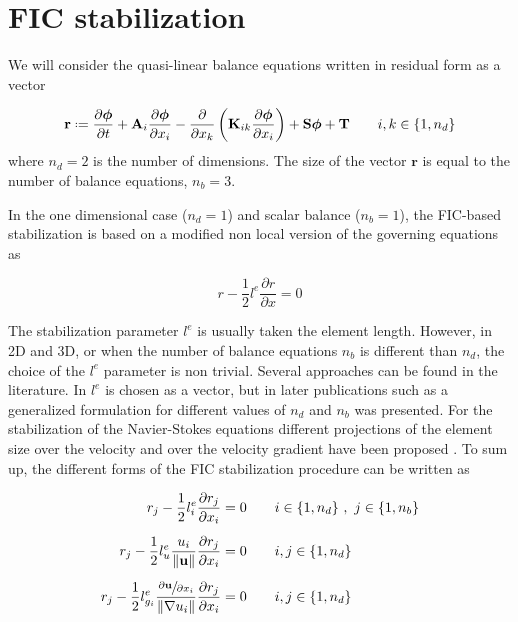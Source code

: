 \documentclass[a4paper,12pt]{article}
\newcommand{\pder}[2]{\frac{\partial#1}{\partial#2}}
\newcommand{\norm}[1]{\lVert#1\rVert}
\newcommand{\defeq}{\mathrel{\vcenter{\baselineskip0.5ex\lineskiplimit0pt\hbox{\scriptsize.}\hbox{\scriptsize.}}}=}
\begin{document}
\section{FIC stabilization}\label{sec:stabilization}

We will consider the quasi-linear balance equations written in residual form as a vector

\begin{equation} \label{residual}
\mathbf{r} \defeq 
  \pder{\bm{\phi}}{t} + \mathbf{A}_i\pder{\bm{\phi}}{x_i}
  -\pder{}{x_k}\left(\mathbf{K}_{ik}\pder{\bm{\phi}}{x_i}\right) + \mathbf{S}\bm{\phi} + \mathbf{T} \qquad i,k\in\{1,n_d\}
\end{equation}
where $n_d=2$ is the number of dimensions. The size of the vector $\mathbf{r}$ is equal to the number of balance equations, $n_b=3$.

In the one dimensional case ($n_d=1$) and scalar balance ($n_b=1$), the FIC-based stabilization is based on a modified non local version of the governing equations as \cite{onate1998}

\begin{equation}
r - \frac{1}{2}l^e\pder{r}{x} = 0
\end{equation}

The stabilization parameter $l^e$ is usually taken the element length. However, in 2D and 3D, or when the number of balance equations $n_b$ is different than $n_d$, the choice of the $l^e$ parameter is non trivial.
Several approaches can be found in the literature. In \cite{onate1998} $l^e$ is chosen as a vector, but in later publications such as \cite{onate2001} a generalized formulation for different values of $n_d$ and $n_b$ was presented.
For the stabilization of the Navier-Stokes equations different projections of the element size over the velocity and over the velocity gradient have been proposed \cite{cotela2016}. To sum up, the different forms of the FIC stabilization procedure can be written as

\begin{subequations}
\begin{align}
r_j - \frac{1}{2}l^e_i\pder{r_j}{x_i} &= 0
    \qquad i\in\{1,n_d\} \ ,\ j\in\{1,n_b\}\\[5pt]
r_j - \frac{1}{2}l^e_u\frac{u_i}{\norm{\mathbf{u}}}\pder{r_j}{x_i} &= 0
    \qquad i,j\in\{1,n_d\}\\[5pt]
r_j - \frac{1}{2}l^e_{g_i}\frac{\sfrac{\partial\mathbf{u}}{\partial x_i}}{\norm{\nabla u_i}}\pder{r_j}{x_i} &= 0
    \qquad i,j\in\{1,n_d\}
\end{align}
\end{subequations}
\end{document}

